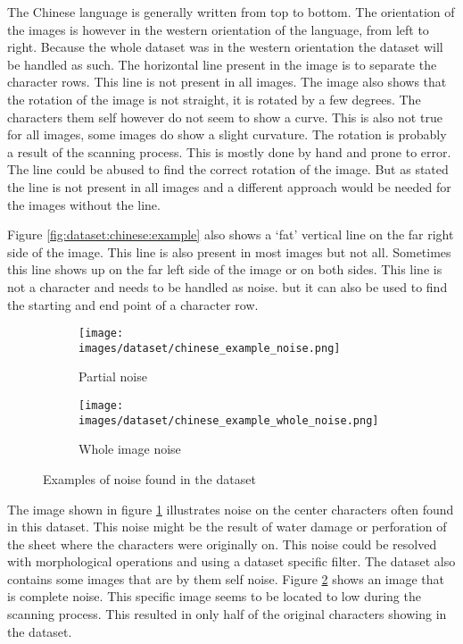 The Chinese language is generally written from top to bottom. The orientation of the images is however in the western orientation of the language, from left to right. Because the whole dataset was in the western orientation the dataset will be handled as such. The horizontal line present in the image is to separate the character rows. This line is not present in all images. The image also shows that the rotation of the image is not straight, it is rotated by a few degrees. The characters them self however do not seem to show a curve. This is also not true for all images, some images do show a slight curvature. The rotation is probably a result of the scanning process. This is mostly done by hand and prone to error. The line could be abused to find the correct rotation of the image. But as stated the line is not present in all images and a different approach would be needed for the images without the line.

Figure \ref{fig:dataset:chinese:example} also shows a `fat' vertical line on the far right side of the image. This line is also present in most images but not all. Sometimes this line shows up on the far left side of the image or on both sides. This line is not a character and needs to be handled as noise. but it can also be used to find the starting and end point of a character row.

\begin{figure}[ht]
  	\centering
  	\begin{subfigure}{\textwidth}
		\centering
		\texttt{[image: images/dataset/chinese\_example\_noise.png]}
 		\caption{Partial noise}
 		\label{fig:dataset:noise:partial}
	\end{subfigure}

	\begin{subfigure}{\textwidth}
 		\centering
		\texttt{[image: images/dataset/chinese\_example\_whole\_noise.png]}
 		\caption{Whole image noise}
 		\label{fig:dataset:noise:whole}
   	\end{subfigure}
    \caption{Examples of noise found in the dataset}
	\label{fig:dataset:noise}
\end{figure}


The image shown in figure \ref{fig:dataset:noise:partial} illustrates noise on the center characters often found in this dataset. This noise might be the result of water damage or perforation of the sheet where the characters were originally on. This noise could be resolved with morphological operations and using a dataset specific filter. The dataset also contains some images that are by them self noise. Figure \ref{fig:dataset:noise:whole} shows an image that is complete noise. This specific image seems to be located to low during the scanning process. This resulted in only half of the original characters showing in the dataset.

